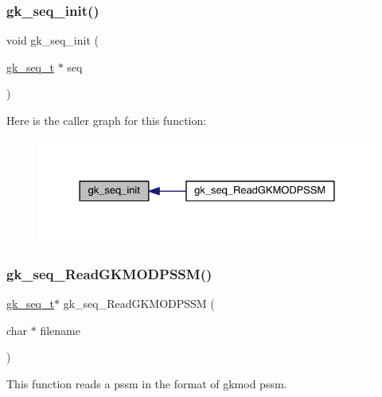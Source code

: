 \subsubsection{\texorpdfstring{gk\+\_\+seq\+\_\+init()}{gk\_seq\_init()}}
{\footnotesize\ttfamily void gk\+\_\+seq\+\_\+init (\begin{DoxyParamCaption}\item[{\hyperlink{a00674}{gk\+\_\+seq\+\_\+t} $\ast$}]{seq }\end{DoxyParamCaption})}

Here is the caller graph for this function\+:\nopagebreak
\begin{figure}[H]
\begin{center}
\leavevmode
\includegraphics[width=328pt]{a00077_aab063d2d2e459531af4b4adfbf208054_icgraph}
\end{center}
\end{figure}
\mbox{\label{a00077_a3cafd54880b0693e95789c512c6f22d3}} 
\subsubsection{\texorpdfstring{gk\+\_\+seq\+\_\+\+Read\+G\+K\+M\+O\+D\+P\+S\+S\+M()}{gk\_seq\_ReadGKMODPSSM()}}
{\footnotesize\ttfamily \hyperlink{a00674}{gk\+\_\+seq\+\_\+t}$\ast$ gk\+\_\+seq\+\_\+\+Read\+G\+K\+M\+O\+D\+P\+S\+SM (\begin{DoxyParamCaption}\item[{char $\ast$}]{filename }\end{DoxyParamCaption})}



This function reads a pssm in the format of gkmod pssm. 


